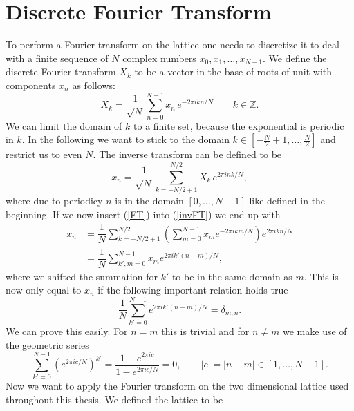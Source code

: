 \section{Discrete Fourier Transform}
To perform a Fourier transform on the lattice one needs to discretize it to deal with a finite sequence of $N$ complex numbers $x_{0},x_{1},\ldots,x_{N-1}$. We define the discrete Fourier transform $X_{k}$ to be a vector in the base of roots of unit with components $x_{n}$ as follows:
\begin{equation}
X_{k}=\dfrac{1}{\sqrt{N}} \sum\limits_{n=0}^{N-1} x_{n} \, e ^{-2\pi  i kn /N} \qquad  k \in \mathbb{Z}.
\label{FT}
\end{equation}
We can limit the domain of $k$ to a finite set, because the exponential is periodic in $k$. In the following we want to stick to the domain $k \in \left[ -\tfrac{N}{2}+1,\ldots,\tfrac{N}{2} \right]$ and restrict us to even $N$. The inverse transform can be defined to be
%
\begin{equation}
 x_{n}= \dfrac{1}{\sqrt{N}} \sum\limits_{k=-N/2+1}^{N/2} X_{k} \, e ^{2 \pi  i nk /N},
 \label{invFT}
 \end{equation}
 where due to periodicy $n$ is in the domain $\left[0,\ldots,N-1\right]$ like defined in the beginning. If we now insert (\ref{FT}) into (\ref{invFT}) we end up with
\begin{align}
x_{n} &=\dfrac{1}{N}\sum\limits_{k=-N/2+1}^{N/2} \left( \sum\limits_{m=0}^{N-1} x_{m}  e ^{-2\pi  i km /N} \right)  e ^{2\pi  i kn /N} \\
%
%
&= \dfrac{1}{N} \sum\limits_{k',m=0}^{N-1} x_{m}  e ^{2\pi  i k'(n-m) /N},
\end{align}
where we shifted the summation for $k'$ to be in the same domain as $m$. This is now only equal to $x_{n}$ if the following important relation holds true
%
%
\begin{equation}
\dfrac{1}{N} \sum\limits_{k'=0}^{N-1}  e ^{2\pi  i k'(n-m) /N} = \delta_{m,n}.
\end{equation}
We can prove this easily. For $n=m$ this is trivial and for $n\neq m$ we make use of the geometric series
\begin{equation}
\sum\limits_{k'=0}^{N-1} \left( e ^{2\pi i  c/N }\right)^{k'} = \dfrac{1- e ^{2\pi i  c}}{1- e ^{2\pi i  c/N }} = 0, \qquad  \vert c\vert = \vert n-m \vert \in [1,\ldots,N-1].
\end{equation}
%
%
Now we want to apply the Fourier transform on the two dimensional lattice used throughout this thesis. We defined the lattice to be
